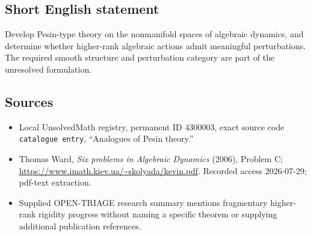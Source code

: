 \documentclass[11pt]{article}
\begin{document}
\subsection{Short English statement}
Develop Pesin-type theory on the nonmanifold spaces of algebraic dynamics, and determine whether higher-rank algebraic actions admit meaningful perturbations. The required smooth structure and perturbation category are part of the unresolved formulation.
\subsection{Sources}
\begin{itemize}
\item Local UnsolvedMath registry, permanent ID \(4300003\), exact source code \texttt{catalogue entry}, ``Analogues of Pesin theory.''
\item Thomas Ward, \emph{Six problems in Algebraic Dynamics} (2006), Problem C; \url{https://www.imath.kiev.ua/~skolyada/kevin.pdf}. Recorded access 2026-07-29; pdf-text extraction.
\item Supplied OPEN-TRIAGE research summary mentions fragmentary higher-rank rigidity progress without naming a specific theorem or supplying additional publication references.
\end{itemize}
\end{document}
